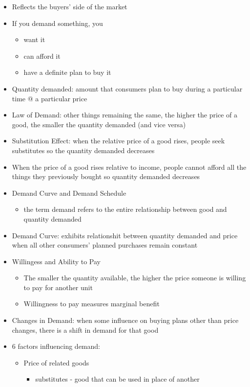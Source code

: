 \documentclass[11pt]{article}
\begin{document}
\begin{itemize}
\item Reflects the buyers' side of the market
\item If you demand something, you
\begin{itemize}
\item want it
\item can afford it
\item have a definite plan to buy it
\end{itemize}
\item Quantity demanded: amount that consumers plan to buy 
during a particular time @ a particular price
\item Law of Demand: other things remaining the same, the higher the price of a good, the smaller
the quantity demanded (and vice versa)
\item Substitution Effect: when the relative price of a good rises, people seek substitutes so
the quantity demanded decreases
\item When the price of a good rises relative to income, people cannot afford all the things
they previously bought so quantity demanded decreases
\item Demand Curve and Demand Schedule
\begin{itemize}
\item the term demand refers to the entire relationship between good and quantity demanded
\end{itemize}
\item Demand Curve: exhibits relationshit between quantity demanded and price when all other
consumers' planned purchases remain constant
\item Willingess and Ability to Pay
\begin{itemize}
\item The smaller the quantity available, the higher the price someone is willing to pay for
another unit
\item Willingness to pay measures marginal benefit
\end{itemize}
\item Changes in Demand: when some influence on buying plans other than price changes, there is a
shift in demand for that good
\item 6 factors influencing demand:
\begin{itemize}
\item Price of related goods
\begin{itemize}
\item substitutes - good that can be used in place of another

\end{itemize}
\end{itemize}
\end{itemize}
\end{document}

